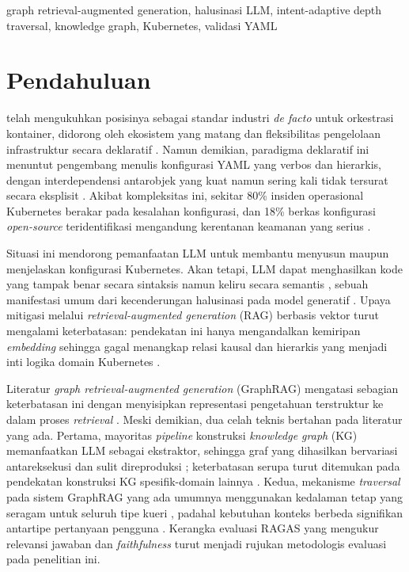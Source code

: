 \documentclass{ieeeaccess}
\begin{document}
\begin{keywords}
graph retrieval-augmented generation, halusinasi LLM, intent-adaptive depth traversal, knowledge graph, Kubernetes, validasi YAML
\end{keywords}

\section{Pendahuluan}
\label{sec:pendahuluan}

 \cite{k8s_docs_concepts} telah mengukuhkan posisinya sebagai standar industri \textit{de facto} untuk orkestrasi kontainer, didorong oleh ekosistem yang matang dan fleksibilitas pengelolaan infrastruktur secara deklaratif \cite{cncf_2023_survey,gartner_cloud_2021}. Namun demikian, paradigma deklaratif ini menuntut pengembang menulis konfigurasi YAML yang verbos dan hierarkis, dengan interdependensi antarobjek yang kuat namun sering kali tidak tersurat secara eksplisit \cite{soldani_pains_2018}. Akibat kompleksitas ini, sekitar 80\% insiden operasional Kubernetes berakar pada kesalahan konfigurasi, dan 18\% berkas konfigurasi \textit{open-source} teridentifikasi mengandung kerentanan keamanan yang serius \cite{rahman2023misconfigurations}.

Situasi ini mendorong pemanfaatan LLM untuk membantu menyusun maupun menjelaskan konfigurasi Kubernetes. Akan tetapi, LLM dapat menghasilkan kode yang tampak benar secara sintaksis namun keliru secara semantis \cite{liu2024deepanalysis}, sebuah manifestasi umum dari kecenderungan halusinasi pada model generatif \cite{ji_hallucination_2023}. Upaya mitigasi melalui \textit{retrieval-augmented generation} (RAG) berbasis vektor turut mengalami keterbatasan: pendekatan ini hanya mengandalkan kemiripan \textit{embedding} sehingga gagal menangkap relasi kausal dan hierarkis yang menjadi inti logika domain Kubernetes \cite{wan2025empowering}.

Literatur \textit{graph retrieval-augmented generation} (GraphRAG) mengatasi sebagian keterbatasan ini dengan menyisipkan representasi pengetahuan terstruktur ke dalam proses \textit{retrieval} \cite{han_graphrag_2024,he2024gretriever}. Meski demikian, dua celah teknis bertahan pada literatur yang ada. Pertama, mayoritas \textit{pipeline} konstruksi \textit{knowledge graph} (KG) memanfaatkan LLM sebagai ekstraktor, sehingga graf yang dihasilkan bervariasi antareksekusi dan sulit direproduksi \cite{pan2024unifying,hofer2024construction,ma_llm_kg_2025}; keterbatasan serupa turut ditemukan pada pendekatan konstruksi KG spesifik-domain lainnya \cite{abusalih2021domain}. Kedua, mekanisme \textit{traversal} pada sistem GraphRAG yang ada umumnya menggunakan kedalaman tetap yang seragam untuk seluruh tipe kueri \cite{civiot2025graphrag,hsgrag2025acm,cao2025neusymrag}, padahal kebutuhan konteks berbeda signifikan antartipe pertanyaan pengguna \cite{rag_survey,moreno2025rag}. Kerangka evaluasi RAGAS \cite{es_ragas_2023} yang mengukur relevansi jawaban dan \textit{faithfulness} turut menjadi rujukan metodologis evaluasi pada penelitian ini.
\end{document}

